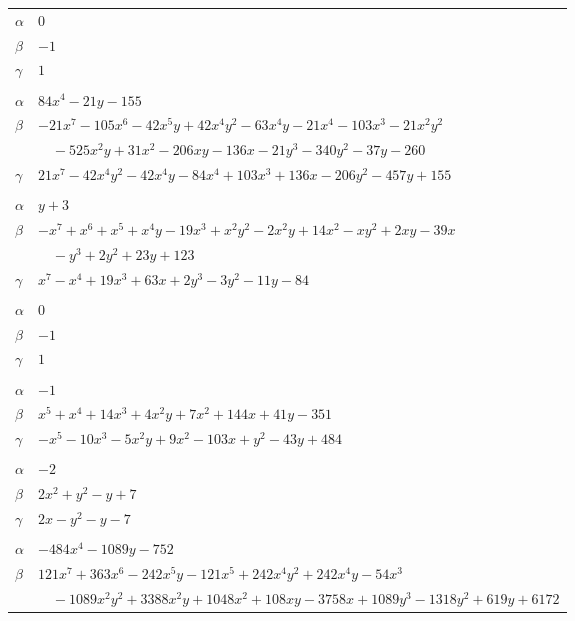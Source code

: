 \documentclass[11pt]{article}
\begin{document}
\begin{longtable}{@{}ll@{}}
$\alpha$ & $0$\\
$\beta$ & $-1$\\
$\gamma$ & $1$\\
\addlinespace[3pt]
\multicolumn{2}{@{}l}{$\{i,j\}=\{23,29\}$, $k_{ij}=2^{2}\cdot 5\cdot 13$}\\
$\alpha$ & $84x^{4}-21y-155$\\
$\beta$ & $-21x^{7}-105x^{6}-42x^{5}y+42x^{4}y^{2}-63x^{4}y-21x^{4}-103x^{3}-21x^{2}y^{2}$\\
 & $\quad -525x^{2}y+31x^{2}-206xy-136x-21y^{3}-340y^{2}-37y-260$\\
$\gamma$ & $21x^{7}-42x^{4}y^{2}-42x^{4}y-84x^{4}+103x^{3}+136x-206y^{2}-457y+155$\\
\addlinespace[3pt]
\multicolumn{2}{@{}l}{$\{i,j\}=\{25,33\}$, $k_{ij}=3\cdot 5\cdot 11$}\\
$\alpha$ & $y+3$\\
$\beta$ & $-x^{7}+x^{6}+x^{5}+x^{4}y-19x^{3}+x^{2}y^{2}-2x^{2}y+14x^{2}-xy^{2}+2xy-39x$\\
 & $\quad -y^{3}+2y^{2}+23y+123$\\
$\gamma$ & $x^{7}-x^{4}+19x^{3}+63x+2y^{3}-3y^{2}-11y-84$\\
\addlinespace[3pt]
\multicolumn{2}{@{}l}{$\{i,j\}=\{26,27\}$, $k_{ij}=2$}\\
$\alpha$ & $0$\\
$\beta$ & $-1$\\
$\gamma$ & $1$\\
\addlinespace[3pt]
\multicolumn{2}{@{}l}{$\{i,j\}=\{26,28\}$, $k_{ij}=2^{3}\cdot 3\cdot 5\cdot 11$}\\
$\alpha$ & $-1$\\
$\beta$ & $x^{5}+x^{4}+14x^{3}+4x^{2}y+7x^{2}+144x+41y-351$\\
$\gamma$ & $-x^{5}-10x^{3}-5x^{2}y+9x^{2}-103x+y^{2}-43y+484$\\
\addlinespace[3pt]
\multicolumn{2}{@{}l}{$\{i,j\}=\{27,32\}$, $k_{ij}=2$}\\
$\alpha$ & $-2$\\
$\beta$ & $2x^{2}+y^{2}-y+7$\\
$\gamma$ & $2x-y^{2}-y-7$\\
\addlinespace[3pt]
\multicolumn{2}{@{}l}{$\{i,j\}=\{28,32\}$, $k_{ij}=2^{6}\cdot 3^{3}\cdot 5$}\\
$\alpha$ & $-484x^{4}-1089y-752$\\
$\beta$ & $121x^{7}+363x^{6}-242x^{5}y-121x^{5}+242x^{4}y^{2}+242x^{4}y-54x^{3}$\\
 & $\quad -1089x^{2}y^{2}+3388x^{2}y+1048x^{2}+108xy-3758x+1089y^{3}-1318y^{2}+619y+6172$\\

\end{longtable}
\end{document}
